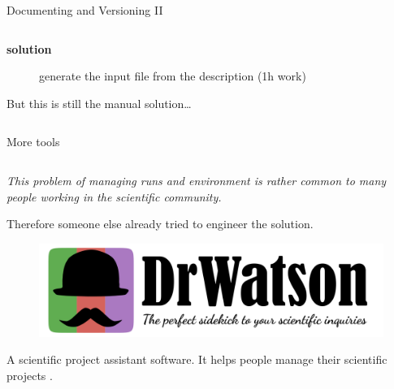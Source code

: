 \documentclass[9pt]{beamer}
\begin{document}
\begin{frame}[fragile]{Documenting and Versioning II}
\begin{columns}
\begin{column}{0.5\textwidth}
\begin{description}
                    \begin{description}
                        \item[\textbf{solution}] generate the input file from
                            the description (1h work)
                    \end{description}
            \end{description}
            \vspace*{10pt}


            But this is still the manual solution\dots
        \end{column}
    \end{columns}
\end{frame}

\begin{frame}{More tools}
    \begin{columns}
        \begin{column}{0.5\textwidth}
            \vspace*{10pt}
            \begin{center}
                \itshape
                This problem of managing runs and environment is rather common
                to many people working in the scientific community.
            \end{center}
            \vspace*{5pt}

            Therefore someone else already tried to engineer the solution.
            \vspace*{15pt}

            \begin{figure}
                \centering
                \href{https://juliadynamics.github.io/DrWatson.jl/dev/}{
                    \includegraphics[width=0.9\hsize]{drwatson}
                }
            \end{figure}
            \begin{center}
            \end{center}
            \begin{displayquote}
                A scientific project assistant software. It helps people manage
                their scientific projects \cite{Datseris2020}.
            \end{displayquote}


\end{column}
\end{columns}
\end{frame}
\end{document}
